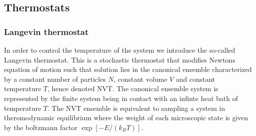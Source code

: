 

\subsection{Thermostats}

\subsubsection*{Langevin thermostat}





In order to control the temperature of the system we introduce the so-called Langevin thermostat. This is a stochastic thermostat that modifies Newtons equation of motion such that solution lies in the canonical ensemble characterized by a constant number of particles $N$, constant volume $V$ and constant temperature $T$, hence denoted NVT. The canonical ensemble system is represented by the finite system being in contact with an infinte heat bath of temperature $T$. The NVT ensemble is equivalent to sampling a system in theromodynamic equilibrium where the weight of each microscopic state is given by the boltzmann factor $\exp[-E/(k_B T)]$.

